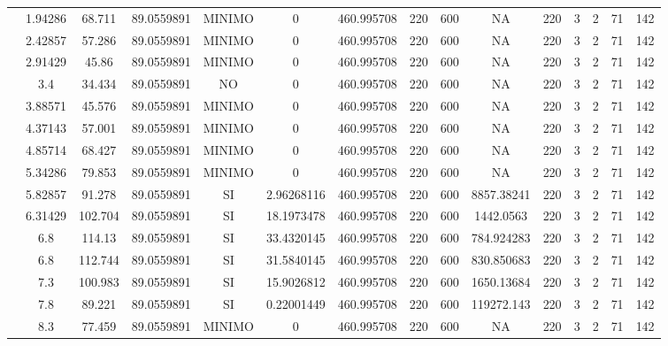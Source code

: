 \begin{table}[H]
{\begin{tabular}{|c|c|c|c|c|c|c|c|c|c|c|c|c|c|c|}
\cline{2-15}    & 1.94286 & 68.711 & 89.0559891 & MINIMO & 0   & 460.995708 & 220 & 600 & NA  & 220 & 3   & 2   & 71  & 142 \bigstrut\\
\cline{2-15}    & 2.42857 & 57.286 & 89.0559891 & MINIMO & 0   & 460.995708 & 220 & 600 & NA  & 220 & 3   & 2   & 71  & 142 \bigstrut\\
\cline{2-15}    & 2.91429 & 45.86 & 89.0559891 & MINIMO & 0   & 460.995708 & 220 & 600 & NA  & 220 & 3   & 2   & 71  & 142 \bigstrut\\
\cline{2-15}    & 3.4 & 34.434 & 89.0559891 & NO  & 0   & 460.995708 & 220 & 600 & NA  & 220 & 3   & 2   & 71  & 142 \bigstrut\\
\cline{2-15}    & 3.88571 & 45.576 & 89.0559891 & MINIMO & 0   & 460.995708 & 220 & 600 & NA  & 220 & 3   & 2   & 71  & 142 \bigstrut\\
\cline{2-15}    & 4.37143 & 57.001 & 89.0559891 & MINIMO & 0   & 460.995708 & 220 & 600 & NA  & 220 & 3   & 2   & 71  & 142 \bigstrut\\
\cline{2-15}    & 4.85714 & 68.427 & 89.0559891 & MINIMO & 0   & 460.995708 & 220 & 600 & NA  & 220 & 3   & 2   & 71  & 142 \bigstrut\\
\cline{2-15}    & 5.34286 & 79.853 & 89.0559891 & MINIMO & 0   & 460.995708 & 220 & 600 & NA  & 220 & 3   & 2   & 71  & 142 \bigstrut\\
\cline{2-15}    & 5.82857 & 91.278 & 89.0559891 & SI  & 2.96268116 & 460.995708 & 220 & 600 & 8857.38241 & 220 & 3   & 2   & 71  & 142 \bigstrut\\
\cline{2-15}    & 6.31429 & 102.704 & 89.0559891 & SI  & 18.1973478 & 460.995708 & 220 & 600 & 1442.0563 & 220 & 3   & 2   & 71  & 142 \bigstrut\\
\cline{2-15}    & 6.8 & 114.13 & 89.0559891 & SI  & 33.4320145 & 460.995708 & 220 & 600 & 784.924283 & 220 & 3   & 2   & 71  & 142 \bigstrut\\
\cline{2-15}    & 6.8 & 112.744 & 89.0559891 & SI  & 31.5840145 & 460.995708 & 220 & 600 & 830.850683 & 220 & 3   & 2   & 71  & 142 \bigstrut\\
\cline{2-15}    & 7.3 & 100.983 & 89.0559891 & SI  & 15.9026812 & 460.995708 & 220 & 600 & 1650.13684 & 220 & 3   & 2   & 71  & 142 \bigstrut\\
\cline{2-15}    & 7.8 & 89.221 & 89.0559891 & SI  & 0.22001449 & 460.995708 & 220 & 600 & 119272.143 & 220 & 3   & 2   & 71  & 142 \bigstrut\\
\cline{2-15}    & 8.3 & 77.459 & 89.0559891 & MINIMO & 0   & 460.995708 & 220 & 600 & NA  & 220 & 3   & 2   & 71  & 142 \bigstrut\\

\end{tabular}}
\end{table}
